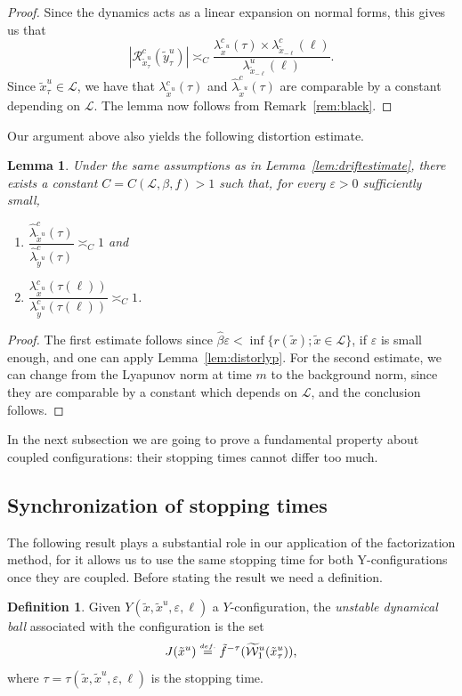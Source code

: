\documentclass[a4paper,11pt,reqno]{amsart}
\newcommand{\cL}{{\mathcal L}}
\newcommand{\cW}{{\mathcal W}}
\newcommand{\cR}{{\mathcal R}}
\newcommand{\eps}{\varepsilon}
\newcommand{\eqdef}{\stackrel{\scriptscriptstyle\textrm def.}{=}}
\newcommand{\tix}{\tilde{x}}
\newcommand{\tif}{\tilde{f}}
\newcommand{\w}{\widetilde{\cW}}
\newtheorem{lemma}[theorem]{Lemma}
\theoremstyle{definition}
\newtheorem{definition}[theorem]{Definition}
\begin{document}
\begin{proof}
Since the dynamics acts as a linear expansion on normal forms, this gives us that 
\[
|\cR^c_{\tix^u_\tau}(\tilde{y}^u_\tau)|\asymp_C\frac{\lambda^c_{\tix^u}(\tau)\times\lambda^c_{\tix_{-\ell}}(\ell)}{\lambda^u_{\tix_{-\ell}}(\ell)}.
\]
Since $\tix^u_\tau\in\cL$, we have that $\lambda^c_{\tix^u}(\tau)$ and $\hat{\lambda}^c_{\tix^u}(\tau)$ are comparable by a constant depending on $\cL$. The lemma now follows from Remark~\ref{rem:black}.
\end{proof}

Our argument above also yields the following distortion estimate. 

\begin{lemma}
    \label{lem:distquadrilateros}
Under the same assumptions as in Lemma~\ref{lem:driftestimate}, there exists a constant $C=C(\cL,\beta,f)>1$ such that, for every $\eps>0$ sufficiently small,
\begin{enumerate}
    \item $\dfrac{\hat{\lambda}^c_{\tix^u}(\tau)}{\hat{\lambda}^c_{\tilde{y}^u}(\tau)}\asymp_C 1$ and
    \item   $\dfrac{\lambda^c_{\tix^u}(\tau(\ell))}{\lambda^c_{\tilde{y}^u}(\tau(\ell))}\asymp_C 1$.
\end{enumerate}
\end{lemma}
\begin{proof}
    The first estimate follows since $\hat{\beta}\eps<\inf\{r(\tix);\tix\in\cL\}$, if $\eps$ is small enough, and one can apply Lemma~\ref{lem:distorlyp}. For the second estimate, we can change from the Lyapunov norm at time $m$ to the background norm, since they are comparable by a constant which depends on $\cL$, and the conclusion follows.
\end{proof}

In the next subsection we are going to prove a fundamental property about coupled configurations: their stopping times cannot differ too much. 

\subsection{Synchronization of stopping times}

The following result plays a substantial role in our application of the factorization method, for it allows us to use the same stopping time for both Y-configurations once they are coupled. Before stating the result we need a definition.

\begin{definition}
Given $Y(\tix,\tix^u,\eps,\ell)$ a $Y$-configuration, the \emph{unstable dynamical ball} associated with the configuration is the set 
\[
J(\tix^u)\eqdef\tif^{-\tau}(\w^u_1(\tix^u_{\tau})),
\]
where $\tau=\tau(\tix,\tix^u,\eps,\ell)$ is the stopping time. 
\end{definition}
\end{document}
